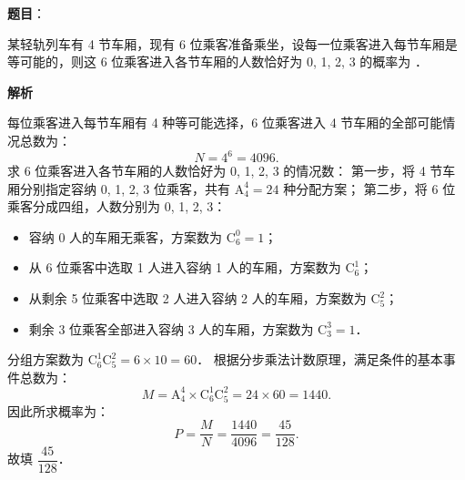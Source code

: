 \begin{answer}

\textbf{题目}：

某轻轨列车有 4 节车厢，现有 6 位乘客准备乘坐，设每一位乘客进入每节车厢是等可能的，则这 6 位乘客进入各节车厢的人数恰好为 0, 1, 2, 3 的概率为 \gkblank{}．

\textbf{解析}

每位乘客进入每节车厢有 4 种等可能选择，6 位乘客进入 4 节车厢的全部可能情况总数为：
\nopagebreak[4]
\[
N = 4^6 = 4096.
\]
求 6 位乘客进入各节车厢的人数恰好为 0, 1, 2, 3 的情况数：
第一步，将 4 节车厢分别指定容纳 0, 1, 2, 3 位乘客，共有 $\mathrm{A}_4^4 = 24$ 种分配方案；
第二步，将 6 位乘客分成四组，人数分别为 0, 1, 2, 3：
\begin{itemize}
\item 容纳 0 人的车厢无乘客，方案数为 $\mathrm{C}_6^0 = 1$；
\item 从 6 位乘客中选取 1 人进入容纳 1 人的车厢，方案数为 $\mathrm{C}_6^1$；
\item 从剩余 5 位乘客中选取 2 人进入容纳 2 人的车厢，方案数为 $\mathrm{C}_5^2$；
\item 剩余 3 位乘客全部进入容纳 3 人的车厢，方案数为 $\mathrm{C}_3^3 = 1$．
\end{itemize}
分组方案数为 $\mathrm{C}_6^1 \mathrm{C}_5^2 = 6 \times 10 = 60$．
根据分步乘法计数原理，满足条件的基本事件总数为：
\nopagebreak[4]
\[
M = \mathrm{A}_4^4 \times \mathrm{C}_6^1 \mathrm{C}_5^2 = 24 \times 60 = 1440.
\]
因此所求概率为：
\nopagebreak[4]
\[
P = \frac{M}{N} = \frac{1440}{4096} = \frac{45}{128}.
\]
故填 $\dfrac{45}{128}$．


\end{answer}
